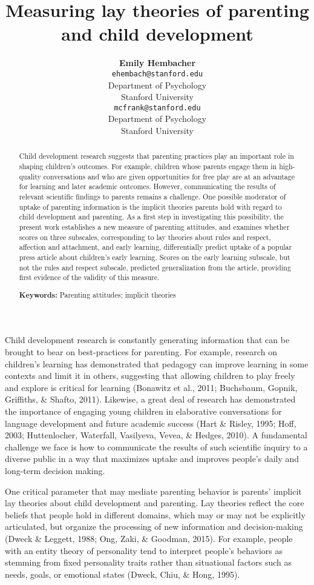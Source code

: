\documentclass[10pt, letterpaper]{article}
\title{Measuring lay theories of parenting and child development}
\author{{\large \bf Emily Hembacher} \\ \texttt{ehembach@stanford.edu} \\ Department of Psychology \\ Stanford University \And {\large \bf Michael C. Frank} \\ \texttt{mcfrank@stanford.edu} \\ Department of Psychology \\ Stanford University}
\begin{document}
\maketitle

\begin{abstract}
Child development research suggests that parenting practices play an
important role in shaping children's outcomes. For example, children
whose parents engage them in high-quality conversations and who are
given opportunities for free play are at an advantage for learning and
later academic outcomes. However, communicating the results of relevant
scientific findings to parents remains a challenge. One possible
moderator of uptake of parenting information is the implicit theories
parents hold with regard to child development and parenting. As a first
step in investigating this possibility, the present work establishes a
new measure of parenting attitudes, and examines whether scores on three
subscales, corresponding to lay theories about rules and respect,
affection and attachment, and early learning, differentially predict
uptake of a popular press article about children's early learning.
Scores on the early learning subscale, but not the rules and respect
subscale, predicted generalization from the article, providing first
evidence of the validity of this measure.

\textbf{Keywords:}
Parenting attitudes; implicit theories
\end{abstract}

Child development research is constantly generating information that can
be brought to bear on best-practices for parenting. For example,
research on children's learning has demonstrated that pedagogy can
improve learning in some contexts and limit it in others, suggesting
that allowing children to play freely and explore is critical for
learning (Bonawitz et al., 2011; Buchsbaum, Gopnik, Griffiths, \&
Shafto, 2011). Likewise, a great deal of research has demonstrated the
importance of engaging young children in elaborative conversations for
language development and future academic success (Hart \& Risley, 1995;
Hoff, 2003; Huttenlocher, Waterfall, Vasilyeva, Vevea, \& Hedges, 2010).
A fundamental challenge we face is how to communicate the results of
such scientific inquiry to a diverse public in a way that maximizes
uptake and improves people's daily and long-term decision making.

One critical parameter that may mediate parenting behavior is parents'
implicit lay theories about child development and parenting. Lay
theories reflect the core beliefs that people hold in different domains,
which may or may not be explicitly articulated, but organize the
processing of new information and decision-making (Dweck \& Leggett,
1988; Ong, Zaki, \& Goodman, 2015). For example, people with an entity
theory of personality tend to interpret people's behaviors as stemming
from fixed personality traits rather than situational factors such as
needs, goals, or emotional states (Dweck, Chiu, \& Hong, 1995).
\end{document}
